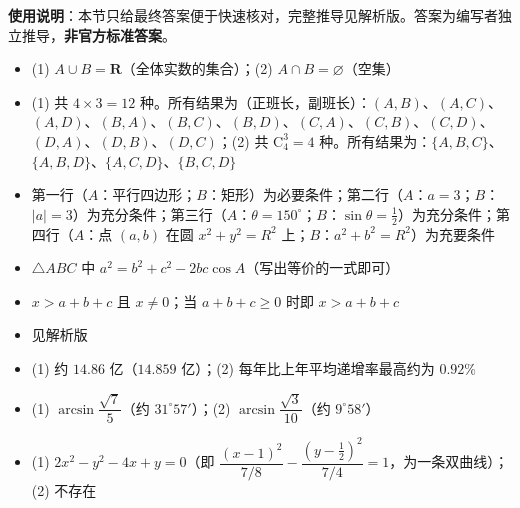 
\begin{gknotice}
\textbf{使用说明}：本节只给最终答案便于快速核对，完整推导见解析版。答案为编写者独立推导，\textbf{非官方标准答案}。
\end{gknotice}

\begin{itemize}[leftmargin=2.6em]
  \item[\textbf{1.}] (1) $A\cup B=\mathbf{R}$（全体实数的集合）；(2) $A\cap B=\varnothing$（空集）
  \item[\textbf{2.}] (1) 共 $4\times3=12$ 种。所有结果为（正班长，副班长）：$(A,B)$、$(A,C)$、$(A,D)$、$(B,A)$、$(B,C)$、$(B,D)$、$(C,A)$、$(C,B)$、$(C,D)$、$(D,A)$、$(D,B)$、$(D,C)$；(2) 共 $\mathrm{C}_4^3=4$ 种。所有结果为：$\{A,B,C\}$、$\{A,B,D\}$、$\{A,C,D\}$、$\{B,C,D\}$
  \item[\textbf{3.}] 第一行（$A$：平行四边形；$B$：矩形）为必要条件；第二行（$A$：$a=3$；$B$：$\lvert a\rvert=3$）为充分条件；第三行（$A$：$\theta=150^\circ$；$B$：$\sin\theta=\frac12$）为充分条件；第四行（$A$：点 $(a,b)$ 在圆 $x^2+y^2=R^2$ 上；$B$：$a^2+b^2=R^2$）为充要条件
  \item[\textbf{4.}] $\triangle ABC$ 中 $a^2=b^2+c^2-2bc\cos A$（写出等价的一式即可）
  \item[\textbf{5.}] $x>a+b+c$ 且 $x\ne0$；当 $a+b+c\geqslant0$ 时即 $x>a+b+c$
  \item[\textbf{6.}] 见解析版
  \item[\textbf{7.}] (1) 约 $14.86$ 亿（$14.859$ 亿）；(2) 每年比上年平均递增率最高约为 $0.92\%$
  \item[\textbf{8.}] (1) $\arcsin\dfrac{\sqrt7}{5}$（约 $31^\circ57'$）；(2) $\arcsin\dfrac{\sqrt3}{10}$（约 $9^\circ58'$）
  \item[\textbf{9.}] (1) $2x^2-y^2-4x+y=0$（即 $\dfrac{(x-1)^2}{7/8}-\dfrac{\left(y-\frac12\right)^2}{7/4}=1$，为一条双曲线）；(2) 不存在
\end{itemize}

